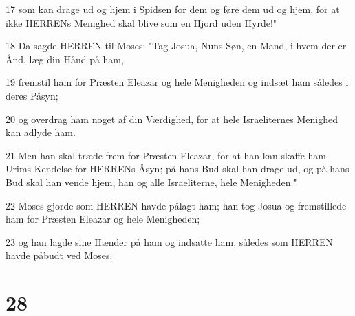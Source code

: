\par 17 som kan drage ud og hjem i Spidsen for dem og føre dem ud og hjem, for at ikke HERRENs Menighed skal blive som en Hjord uden Hyrde!"
\par 18 Da sagde HERREN til Moses: "Tag Josua, Nuns Søn, en Mand, i hvem der er Ånd, læg din Hånd på ham,
\par 19 fremstil ham for Præsten Eleazar og hele Menigheden og indsæt ham således i deres Påsyn;
\par 20 og overdrag ham noget af din Værdighed, for at hele Israeliternes Menighed kan adlyde ham.
\par 21 Men han skal træde frem for Præsten Eleazar, for at han kan skaffe ham Urims Kendelse for HERRENs Åsyn; på hans Bud skal han drage ud, og på hans Bud skal han vende hjem, han og alle Israeliterne, hele Menigheden."
\par 22 Moses gjorde som HERREN havde pålagt ham; han tog Josua og fremstillede ham for Præsten Eleazar og hele Menigheden;
\par 23 og han lagde sine Hænder på ham og indsatte ham, således som HERREN havde påbudt ved Moses.

\chapter{28}

